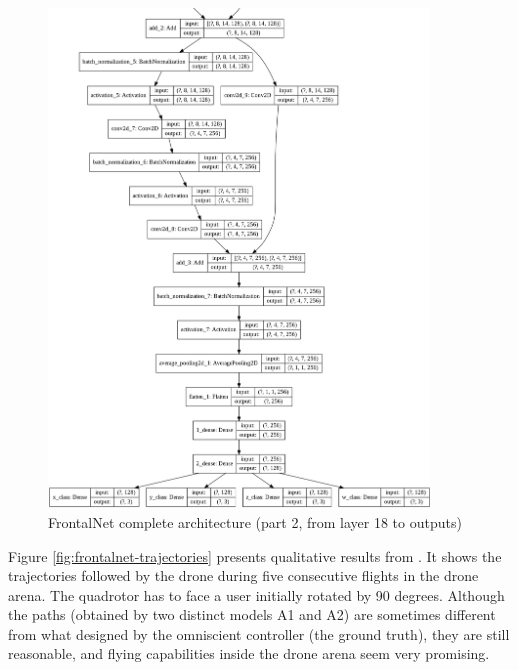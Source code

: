 \begin{figure}[!h]
	\centering
	\includegraphics[width=0.9\textwidth]{"contents/images/03-frontalnet-3B"}
	\caption[FrontalNet complete architecture (part 2)]{FrontalNet complete architecture (part 2, from layer 18 to outputs)}
	\label{fig:frontalnet-architecture-3b}
\end{figure}

\clearpage

Figure \ref{fig:frontalnet-trajectories} presents qualitative results from \cite{mantegazza2019visionbased}. It shows the trajectories followed by the drone during five consecutive flights in the drone arena. The quadrotor has to face a user initially rotated by 90 degrees. Although the paths (obtained by two distinct models A1 and A2) are sometimes different from what designed by the omniscient controller (the ground truth), they are still reasonable, and flying capabilities inside the drone arena seem very promising.

